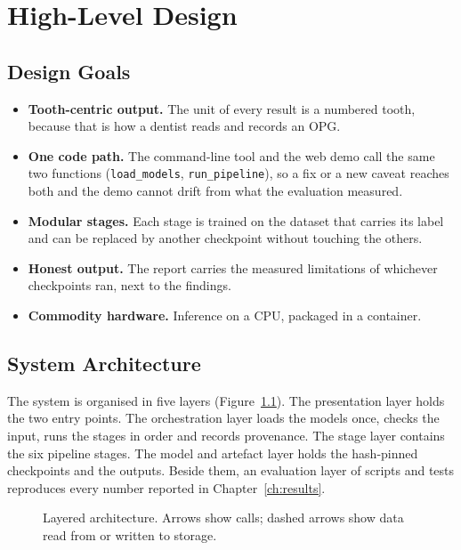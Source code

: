\chapter{High-Level Design}
\label{ch:hld}

\section{Design Goals}

\begin{itemize}
\item \textbf{Tooth-centric output.} The unit of every result is a numbered tooth, because that is
  how a dentist reads and records an OPG.
\item \textbf{One code path.} The command-line tool and the web demo call the same two functions
  (\texttt{load\_models}, \texttt{run\_pipeline}), so a fix or a new caveat reaches both and the demo
  cannot drift from what the evaluation measured.
\item \textbf{Modular stages.} Each stage is trained on the dataset that carries its label and can
  be replaced by another checkpoint without touching the others.
\item \textbf{Honest output.} The report carries the measured limitations of whichever checkpoints
  ran, next to the findings.
\item \textbf{Commodity hardware.} Inference on a CPU, packaged in a container.
\end{itemize}

\section{System Architecture}

The system is organised in five layers (Figure~\ref{fig:layers}). The presentation layer holds the
two entry points. The orchestration layer loads the models once, checks the input, runs the stages
in order and records provenance. The stage layer contains the six pipeline stages. The model and
artefact layer holds the hash-pinned checkpoints and the outputs. Beside them, an evaluation layer of
scripts and tests reproduces every number reported in Chapter~\ref{ch:results}.

\begin{figure}[!htbp]
\centering

\caption[Layered system architecture]{Layered architecture. Arrows show calls; dashed arrows show
data read from or written to storage.}
\label{fig:layers}
\end{figure}

